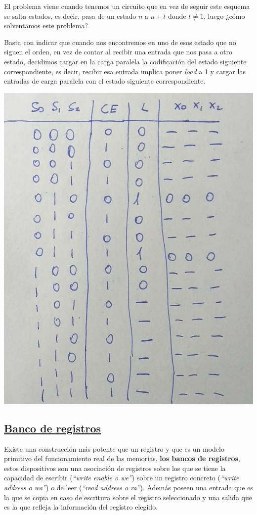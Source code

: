 \documentclass[a4paper,10pt]{book}
\begin{document}
El problema viene cuando tenemos un circuito que en vez de seguir este esquema se salta estados, es decir, pasa de un estado $n$ a $n+t$ donde $t\neq 1$, luego ¿cómo solventamos este problema?


Basta con indicar que cuando nos encontremos en uno de esos estado que no siguen el orden, en vez de contar al recibir una entrada que nos pasa a otro estado, decidimos cargar en la carga paralela la codificación del estado siguiente correspondiente, es decir, recibir esa entrada implica poner \textit{load} a 1 y cargar las entradas de carga paralela con el estado siguiente correspondiente.

\begin{center}
\includegraphics[scale=0.26]{tabla contador}
\end{center}

\subsection*{\underline{Banco de registros}}
Existe una construcción más potente que un registro y que es un modelo primitivo del funcionamiento real de las memorias, \textbf{los bancos de registros}, estos dispositivos son una asociación de registros sobre los que se tiene la capacidad de escribir (\textit{``write enable o we''}) sobre un registro concreto (\textit{``write address o wa''}) o de leer (\textit{``read address o ra''}). Además poseen una entrada que es la que se copia en caso de escritura sobre el registro seleccionado y una salida que es la que refleja la información del registro elegido.
\end{document}
